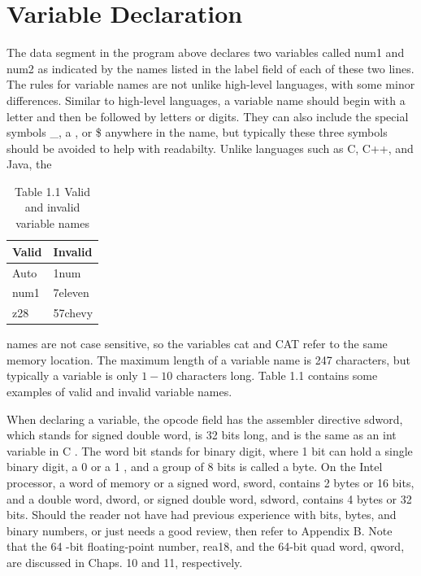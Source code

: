 \documentclass[10pt]{book}
\begin{document}
\section{Variable Declaration}
The data segment in the program above declares two variables called num1 and num2 as indicated by the names listed in the label field of each of these two lines. The rules for variable names are not unlike high-level languages, with some minor differences. Similar to high-level languages, a variable name should begin with a letter and then be followed by letters or digits. They can also include the special symbols \_, a , or \$ anywhere in the name, but typically these three symbols should be avoided to help with readabilty. Unlike languages such as C, C++, and Java, the

\begin{table}[htbp]
\begin{center}
\captionsetup{labelformat=empty}
\caption{Table 1.1 Valid and invalid variable names}
\begin{tabular}{|l|l|}
\hline
Valid & Invalid \\
\hline
Auto & 1num \\
\hline
num1 & 7eleven \\
\hline
z28 & 57chevy \\
\hline
\end{tabular}
\end{center}
\end{table}

names are not case sensitive, so the variables cat and CAT refer to the same memory location. The maximum length of a variable name is 247 characters, but typically a variable is only $1-10$ characters long. Table 1.1 contains some examples of valid and invalid variable names.

When declaring a variable, the opcode field has the assembler directive sdword, which stands for signed double word, is 32 bits long, and is the same as an int variable in C . The word bit stands for binary digit, where 1 bit can hold a single binary digit, a 0 or a 1 , and a group of 8 bits is called a byte. On the Intel processor, a word of memory or a signed word, sword, contains 2 bytes or 16 bits, and a double word, dword, or signed double word, sdword, contains 4 bytes or 32 bits. Should the reader not have had previous experience with bits, bytes, and binary numbers, or just needs a good review, then refer to Appendix B. Note that the 64 -bit floating-point number, rea18, and the 64-bit quad word, qword, are discussed in Chaps. 10 and 11, respectively.
\end{document}
